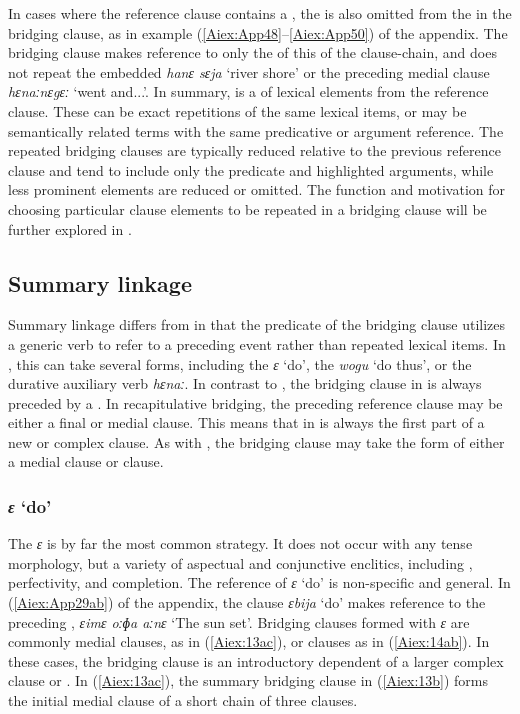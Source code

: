 \documentclass[output=paper]{LSP/langsci}
\begin{document}
In cases where the reference clause contains a , the  is also omitted from the  in the bridging clause, as in example (\ref{Aiex:App48}--\ref{Aiex:App50}) of the appendix. The bridging clause makes reference to only the  of this  of the clause-chain, and does not repeat the embedded  \textit{hanɛ sɛja} `river shore' or the preceding medial clause \textit{hɛnaːnɛgɛː} `went and...'. In summary,  is a  of lexical elements from the reference clause. These can be exact repetitions of the same lexical items, or may be semantically related terms with the same predicative or argument reference. The repeated bridging clauses are typically reduced relative to the previous reference clause and tend to include only the predicate and highlighted arguments, while less prominent elements are reduced or omitted. The function and motivation for choosing particular clause elements to be repeated in a bridging clause will be further explored in .


\subsection{Summary linkage} 
\label{AiSum.linkg}
Summary linkage differs from  in that the predicate of the bridging clause utilizes a generic verb to refer to a preceding event rather than repeated lexical items. In , this can take several forms, including the  \textit{ɛ} `do', the  \textit{wogu} `do thus', or the durative auxiliary verb \textit{hɛnaː}. In contrast to , the bridging clause in  is always preceded by a . In recapitulative bridging, the preceding reference clause may be either a final or medial clause. This means that  in  is always the first part of a new  or complex clause. As with , the bridging clause may take the form of either a medial clause or  clause.

\subsubsection{\textit{ɛ} `do'} 
\label{Ailightverb.do}
	The  \textit{ɛ} is by far the most common  strategy. It does not occur with any tense morphology, but a variety of aspectual and conjunctive enclitics, including , perfectivity, and completion. The reference of \textit{ɛ} `do' is non-specific and general. In (\ref{Aiex:App29ab}) of the appendix, the  clause \textit{ɛbija} ‘do’ makes reference to the preceding , \textit{ɛimɛ oːɸa aːnɛ} `The sun set'.
Bridging clauses formed with \textit{ɛ} are commonly medial clauses, as in (\ref{Aiex:13ac}), or  clauses as in
(\ref{Aiex:14ab}). In these cases, the bridging clause is an introductory dependent of a larger complex clause or . In (\ref{Aiex:13ac}), the summary bridging clause in (\ref{Aiex:13b}) forms the initial medial clause of a short chain of three clauses.
\end{document}
